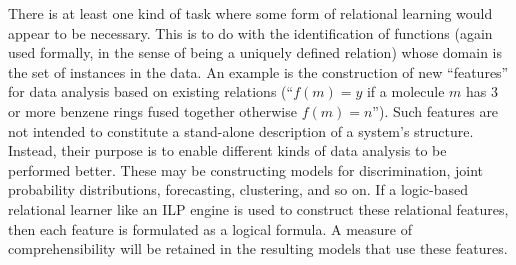 There is at least one kind of                                          
task where some form of relational learning would appear to be necessary.
This is to do with the identification of functions
(again used formally, in the sense of being a uniquely
defined relation) whose domain is the set of instances in the data.
An example is the construction of new ``features'' for data analysis
based on existing relations (``$f(m) = y$ if a molecule $m$ has 3 or more
benzene rings fused together otherwise $f(m) = n$'').
Such features are not intended to constitute a stand-alone
description of a system's structure. Instead, their purpose is to enable
different kinds of data analysis to be performed better. These may be constructing models
for discrimination, joint probability distributions,
forecasting, clustering, and so on. If a logic-based relational learner like an ILP
engine is used to construct these relational features,
then each feature is formulated as a logical formula.
A measure of comprehensibility will be retained in the resulting models that use
these features.

